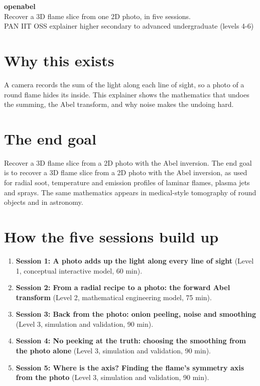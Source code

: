 \documentclass[11pt,a4paper]{article}
\begin{document}
\begin{center}{\LARGE\bfseries openabel}\\[0.4em]{\large Recover a 3D flame slice from one 2D photo, in five sessions.}\\[0.2em]\small PAN IIT OSS explainer \textbullet{} higher secondary to advanced undergraduate (levels 4-6)\end{center}

\section*{Why this exists}
A camera records the sum of the light along each line of sight, so a photo of a round flame hides its inside. This explainer shows the mathematics that undoes the summing, the Abel transform, and why noise makes the undoing hard.

\section*{The end goal}
Recover a 3D flame slice from a 2D photo with the Abel inversion. The end goal is to recover a 3D flame slice from a 2D photo with the Abel inversion, as used for radial soot, temperature and emission profiles of laminar flames, plasma jets and sprays. The same mathematics appears in medical-style tomography of round objects and in astronomy.

\section*{How the five sessions build up}
\begin{enumerate}[nosep]
\item \textbf{Session 1: A photo adds up the light along every line of sight} (Level 1, conceptual interactive model, 60 min).
\item \textbf{Session 2: From a radial recipe to a photo: the forward Abel transform} (Level 2, mathematical engineering model, 75 min).
\item \textbf{Session 3: Back from the photo: onion peeling, noise and smoothing} (Level 3, simulation and validation, 90 min).
\item \textbf{Session 4: No peeking at the truth: choosing the smoothing from the photo alone} (Level 3, simulation and validation, 90 min).
\item \textbf{Session 5: Where is the axis? Finding the flame's symmetry axis from the photo} (Level 3, simulation and validation, 90 min).
\end{enumerate}
\end{document}
